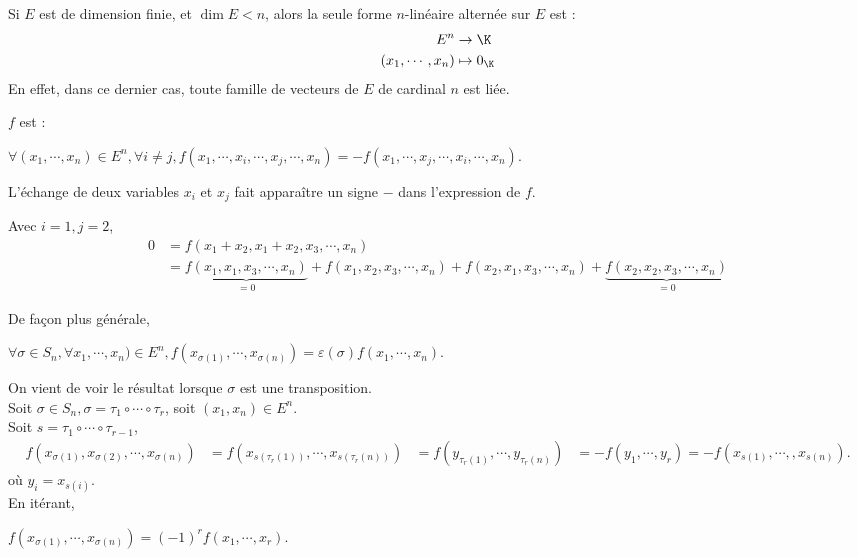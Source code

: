 \documentclass[12pt,a4paper]{report}
\begin{document}
\begin{remarque}{}
Si $E$ est de dimension finie, et $\dim E < n$, alors la seule forme $n$-linéaire alternée sur $E$ est :
\begin{align*}
E^n &\to  \K \\
(x_1,\cdots,x_n) & \mapsto 0_\K
\end{align*}
En effet, dans ce dernier cas, toute famille de vecteurs de $E$ de cardinal $n$ est liée.
\end{remarque}

\begin{proposition}{}{}
$f$ est :
\begin{center}
	$\forall (x_1,\cdots,x_n) \in E^n, \forall i \ne j, f(x_1,\cdots,x_i,\cdots,x_j,\cdots,x_n) = - f(x_1,\cdots, x_j, \cdots, x_i, \cdots, x_n)$.
\end{center}
L'échange de deux variables $x_i$ et $x_j$ fait apparaître un signe $-$ dans l'expression de $f$.
\end{proposition}

\begin{demo}{}
Avec $i=1,j=2$,
\begin{align*}
0 &= f(x_1+x_2,x_1+x_2,x_3,\cdots,x_n) \\
&= \underbrace{f(x_1,x_1,x_3,\cdots,x_n)}_{=0} + f(x_1,x_2,x_3,\cdots,x_n) + f(x_2,x_1,x_3,\cdots,x_n) + \underbrace{f(x_2,x_2,x_3,\cdots,x_n)}_{=0}
\end{align*}
\end{demo}

De façon plus générale,
\begin{center}
$\forall \sigma \in S_n, \forall x_1,\cdots,x_n) \in E^n, f(x_{\sigma(1)},\cdots,x_{\sigma(n)}) = \varepsilon(\sigma) f(x_1,\cdots,x_n)$.
\end{center}

\begin{demo}{}
On vient de voir le résultat lorsque $\sigma$ est une transposition. \\

Soit $\sigma \in S_n, \sigma = \tau_1 \circ \cdots \circ \tau_r$, soit $(x_1, x_n) \in E^n$. \\
Soit $s = \tau_1 \circ \cdots \circ \tau_{r-1}$,
\begin{align*}
f(x_{\sigma(1)},x_{\sigma(2)},\cdots,x_{\sigma(n)}) &= f(x_{s (\tau_r(1))},\cdots,x_{s(\tau_r(n))}) 
&= f(y_{\tau_r(1)},\cdots,y_{\tau_r(n)})
&= -f(y_1,\cdots,y_r) = -f(x_{s(1)},\cdots,,x_{s(n)}).
\end{align*}
où $y_i = x_{s(i)}$. \\
En itérant, 
\begin{center}
$f(x_{\sigma(1)},\cdots,x_{\sigma(n)}) = (-1)^rf(x_1,\cdots,x_r)$.
\end{center}

\end{demo}
\end{document}
